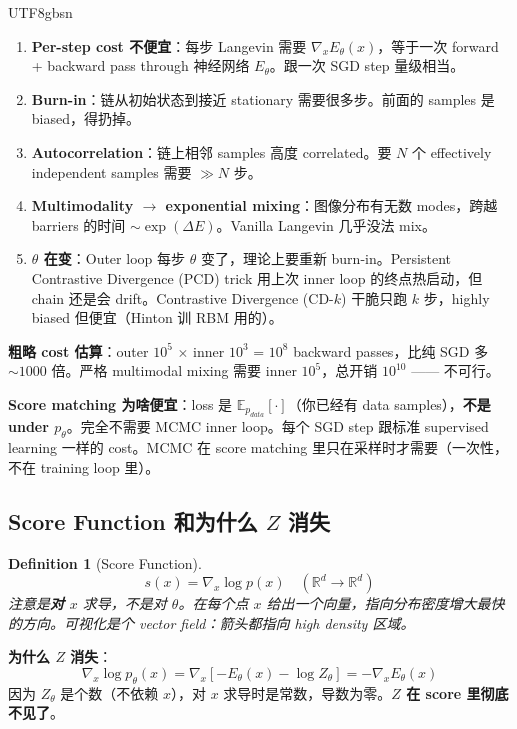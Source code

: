 \documentclass[11pt]{article}
\newtheorem{definition}{Definition}[section]
\begin{document}
\begin{CJK}{UTF8}{gbsn}
\begin{enumerate}[nosep]
  \item \textbf{Per-step cost 不便宜}：每步 Langevin 需要 $\nabla_x E_\theta(x)$，等于一次 forward + backward pass through 神经网络 $E_\theta$。跟一次 SGD step 量级相当。
  \item \textbf{Burn-in}：链从初始状态到接近 stationary 需要很多步。前面的 samples 是 biased，得扔掉。
  \item \textbf{Autocorrelation}：链上相邻 samples 高度 correlated。要 $N$ 个 effectively independent samples 需要 $\gg N$ 步。
  \item \textbf{Multimodality $\to$ exponential mixing}：图像分布有无数 modes，跨越 barriers 的时间 $\sim \exp(\Delta E)$。Vanilla Langevin 几乎没法 mix。
  \item \textbf{$\theta$ 在变}：Outer loop 每步 $\theta$ 变了，理论上要重新 burn-in。Persistent Contrastive Divergence (PCD) trick 用上次 inner loop 的终点热启动，但 chain 还是会 drift。Contrastive Divergence (CD-$k$) 干脆只跑 $k$ 步，highly biased 但便宜（Hinton 训 RBM 用的）。
\end{enumerate}

\textbf{粗略 cost 估算}：outer $10^5$ $\times$ inner $10^3$ = $10^8$ backward passes，比纯 SGD 多 $\sim 1000$ 倍。严格 multimodal mixing 需要 inner $10^5$，总开销 $10^{10}$ —— 不可行。

\textbf{Score matching 为啥便宜}：loss 是 $\mathbb{E}_{p_{data}}[\cdot]$（你已经有 data samples），\textbf{不是 under $p_\theta$}。完全不需要 MCMC inner loop。每个 SGD step 跟标准 supervised learning 一样的 cost。MCMC 在 score matching 里只在采样时才需要（一次性，不在 training loop 里）。

\subsection{Score Function 和为什么 $Z$ 消失}

\begin{definition}[Score Function]
\[
  s(x) = \nabla_x \log p(x) \quad (\mathbb{R}^d \to \mathbb{R}^d)
\]
注意是\textbf{对 $x$} 求导，不是对 $\theta$。在每个点 $x$ 给出一个向量，指向分布密度增大最快的方向。可视化是个 vector field：箭头都指向 high density 区域。
\end{definition}

\textbf{为什么 $Z$ 消失}：
\[
  \nabla_x \log p_\theta(x) = \nabla_x[-E_\theta(x) - \log Z_\theta] = -\nabla_x E_\theta(x)
\]
因为 $Z_\theta$ 是个数（不依赖 $x$），对 $x$ 求导时是常数，导数为零。\textbf{$Z$ 在 score 里彻底不见了}。


\end{CJK}
\end{document}

